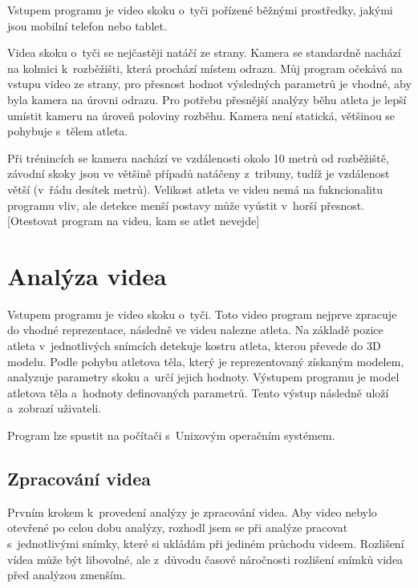 Vstupem programu je video skoku o~tyči pořízené běžnými prostředky, jakými jsou mobilní telefon nebo tablet.

Videa skoku o~tyči se nejčastěji natáčí ze strany. Kamera se standardně nachází na kolmici k~rozběžišti, která prochází místem odrazu. Můj program očekává na vstupu video ze strany, pro přesnost hodnot výsledných parametrů je vhodné, aby byla kamera na úrovni odrazu. Pro potřebu přesnější analýzy běhu atleta je lepší umístit kameru na úroveň poloviny rozběhu. Kamera není statická, většinou se pohybuje s~tělem atleta.


Při trénincích se kamera nachází ve vzdálenosti okolo 10 metrů od rozběžiště, závodní skoky jsou ve většině případů natáčeny z~tribuny, tudíž je vzdálenost větší (v~řádu desítek metrů). Velikost atleta ve videu nemá na fukncionalitu programu vliv, ale detekce menší postavy může vyústit v~horší přesnost. [Otestovat program na videu, kam se atlet nevejde]




\section{Analýza videa}

Vstupem programu je video skoku o~tyči. Toto video program nejprve zpracuje do vhodné reprezentace, následně ve videu nalezne atleta. Na základě pozice atleta v~jednotlivých snímcích detekuje kostru atleta, kterou převede do 3D modelu. Podle pohybu atletova těla, který je reprezentovaný získaným modelem, analyzuje parametry skoku a~určí jejich hodnoty. Výstupem programu je model atletova těla a~hodnoty definovaných parametrů. Tento výstup následně uloží a~zobrazí uživateli.

Program lze spustit na počítači s~Unixovým operačním systémem.



\subsection{Zpracování videa}

Prvním krokem k~provedení analýzy je zpracování videa. Aby video nebylo otevřené po celou dobu analýzy, rozhodl jsem se při analýze pracovat s~jednotlivými snímky, které si ukládám při jediném průchodu videem. Rozlišení vídea může být libovolné, ale z~důvodu časové náročnosti rozlišení snímků videa před analýzou zmenším.



